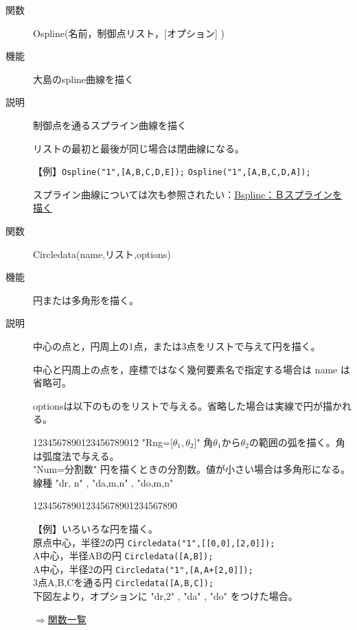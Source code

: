\documentclass[papersize,a4paper,12pt,uplatex]{jsarticle}
\begin{document}
\begin{description}
\vspace{\baselineskip}
\hypertarget{ospline}{}
\item[関数]  Ospline(名前，制御点リスト，[オプション] )
\item[機能]  大島のspline曲線を描く
\item[説明]  制御点を通るスプライン曲線を描く

リストの最初と最後が同じ場合は閉曲線になる。

\vspace{\baselineskip}
【例】\verb|Ospline("1",[A,B,C,D,E]);|  \verb|Ospline("1",[A,B,C,D,A]);|

   

\vspace{\baselineskip}
 スプライン曲線については次も参照されたい：\hyperlink{bspline}{Bspline：Ｂスプラインを描く} 


\vspace{\baselineskip}
\hypertarget{circledata}{}
\item[関数]  Circledata(name,リスト,options)  
\item[機能]  円または多角形を描く。
\item[説明]  中心の点と，円周上の1点，または3点をリストで与えて円を描く。

中心と円周上の点を，座標ではなく幾何要素名で指定する場合は name は省略可。

optionsは以下のものをリストで与える。省略した場合は実線で円が描かれる。
\begin{tabbing}
1234\=567890123456789012\=\kill
 \>    "Rng=[$\theta_1,\theta_2$]"  \>角$\theta_1$から$\theta_2$の範囲の弧を描く。角は弧度法で与える。\\
 \>    "Num=分割数"    \>円を描くときの分割数。値が小さい場合は多角形になる。\\
 \>    線種    \>"dr, n"  , "da,m,n" , "do,m,n"
\end{tabbing}
\begin{tabbing}
1234\=56789012345678901234567890\=\kill

【例】いろいろな円を描く。\\
 \>原点中心，半径2の円  \> \verb|Circledata("1",[[0,0],[2,0]]);|\\
 \>A中心，半径ABの円  \> \verb|Circledata([A,B]);|\\
 \>A中心，半径2の円  \> \verb|Circledata("1",[A,A+[2,0]]);|\\
 \>3点A,B,Cを通る円    \> \verb|Circledata([A,B,C]);|\\
 \>下図左より，オプションに "dr,2" , "da" , "do" をつけた場合。
\end{tabbing}
\hspace{10mm} 
\begin{flushright}  \hyperlink{functionlist}{$\Rightarrow$関数一覧}\end{flushright}


\end{description}
\end{document}
